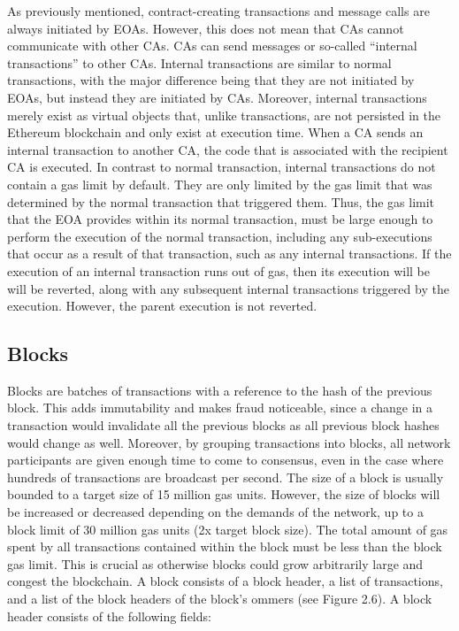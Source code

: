         As previously mentioned, contract-creating transactions and message calls are always initiated by EOAs. However, this does not mean that CAs cannot communicate with other CAs. CAs can send messages or so-called “internal transactions” to other CAs. Internal transactions are similar to normal transactions, with the major difference being that they are not initiated by EOAs, but instead they are initiated by CAs. Moreover, internal transactions merely exist as virtual objects that, unlike transactions, are not persisted in the Ethereum
        blockchain and only exist at execution time. When a CA sends an internal transaction to another CA, the code that is associated with the recipient CA is executed. In contrast to normal transaction, internal transactions do not contain a gas limit by default. They are only limited by the gas limit that was determined by the normal transaction that triggered them. Thus, the gas limit that the EOA provides within its normal transaction, must be large enough to perform the execution of the normal transaction, including any sub-executions that occur as a result of that transaction, such as any internal transactions. If the execution of an internal transaction runs out of gas, then its execution will be will be reverted, along with any subsequent internal transactions triggered by the execution. However, the parent execution is not reverted.


    \subsection{Blocks}

        Blocks are batches of transactions with a reference to the hash of the previous block. This adds immutability and makes fraud noticeable, since a change in a transaction would invalidate all the previous blocks as all previous block hashes would change as well. Moreover, by grouping transactions into blocks, all network participants are given enough time to come to consensus, even in the case where hundreds of transactions are broadcast per second. The size of a block is usually bounded to a target size of 15 million gas units. However, the size of blocks will be increased or decreased depending on the demands of the network, up to a block limit of 30 million gas units (2x target block size). The total amount of gas spent by all transactions contained within the block must be less than the block gas limit. This is crucial as otherwise blocks could grow arbitrarily large and congest the blockchain. A block consists of a block header, a list of transactions, and a list of the block headers of the block’s ommers (see Figure 2.6). A block header consists of the following fields:

